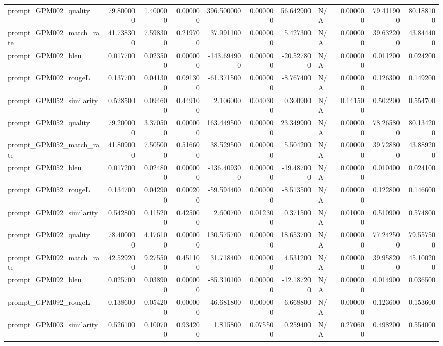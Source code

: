 \begin{tabular}{lrrrrrrlrrr}
prompt_GPM002_quality & 79.800000 & 1.400000 & 0.000000 & 396.500000 & 0.000000 & 56.642900 & N/A & 0.000000 & 79.411900 & 80.188100 \\
prompt_GPM002_match_rate & 41.738300 & 7.598300 & 0.219700 & 37.991100 & 0.000000 & 5.427300 & N/A & 0.000000 & 39.632200 & 43.844400 \\
prompt_GPM002_bleu & 0.017700 & 0.023500 & 0.000000 & -143.694900 & 0.000000 & -20.527800 & N/A & 0.000000 & 0.011200 & 0.024200 \\
prompt_GPM002_rougeL & 0.137700 & 0.041300 & 0.091300 & -61.371500 & 0.000000 & -8.767400 & N/A & 0.000000 & 0.126300 & 0.149200 \\
prompt_GPM052_similarity & 0.528500 & 0.094600 & 0.449100 & 2.106000 & 0.040300 & 0.300900 & N/A & 0.141500 & 0.502200 & 0.554700 \\
prompt_GPM052_quality & 79.200000 & 3.370500 & 0.000000 & 163.449500 & 0.000000 & 23.349900 & N/A & 0.000000 & 78.265800 & 80.134200 \\
prompt_GPM052_match_rate & 41.809000 & 7.505000 & 0.516600 & 38.529500 & 0.000000 & 5.504200 & N/A & 0.000000 & 39.728800 & 43.889200 \\
prompt_GPM052_bleu & 0.017200 & 0.024800 & 0.000000 & -136.409300 & 0.000000 & -19.487000 & N/A & 0.000000 & 0.010400 & 0.024100 \\
prompt_GPM052_rougeL & 0.134700 & 0.042900 & 0.000200 & -59.594400 & 0.000000 & -8.513500 & N/A & 0.000000 & 0.122800 & 0.146600 \\
prompt_GPM092_similarity & 0.542800 & 0.115200 & 0.425000 & 2.600700 & 0.012300 & 0.371500 & N/A & 0.010000 & 0.510900 & 0.574800 \\
prompt_GPM092_quality & 78.400000 & 4.176100 & 0.000000 & 130.575700 & 0.000000 & 18.653700 & N/A & 0.000000 & 77.242500 & 79.557500 \\
prompt_GPM092_match_rate & 42.529200 & 9.275500 & 0.451100 & 31.718400 & 0.000000 & 4.531200 & N/A & 0.000000 & 39.958200 & 45.100200 \\
prompt_GPM092_bleu & 0.025700 & 0.038900 & 0.000000 & -85.310100 & 0.000000 & -12.187200 & N/A & 0.000000 & 0.014900 & 0.036500 \\
prompt_GPM092_rougeL & 0.138600 & 0.054200 & 0.000000 & -46.681800 & 0.000000 & -6.668800 & N/A & 0.000000 & 0.123600 & 0.153600 \\
prompt_GPM003_similarity & 0.526100 & 0.100700 & 0.934200 & 1.815800 & 0.075500 & 0.259400 & N/A & 0.270600 & 0.498200 & 0.554000 \\

\end{tabular}
